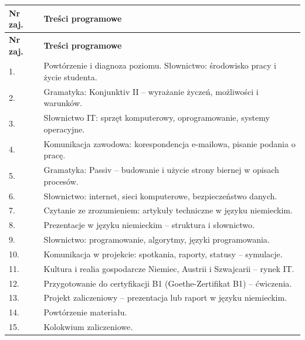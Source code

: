 \documentclass[12pt, a4paper]{article}
\newcommand{\thdrule}{\noalign{\global\setlength{\extrarowheight}{0pt}}}
\newcommand{\thdend}{\noalign{\global\setlength{\extrarowheight}{3pt}}}
\begin{document}
{\scriptsize
\begin{longtable}{m{1.5cm}m{14.5cm}}
\thdrule\toprule
\rowcolor{pjatkRed} {\color{white}\textbf{Nr zaj.}} & {\color{white}\textbf{Treści programowe}} \\
\midrule\thdend
\endfirsthead
\thdrule\toprule
\rowcolor{pjatkRed} {\color{white}\textbf{Nr zaj.}} & {\color{white}\textbf{Treści programowe}} \\
\midrule\thdend
\endhead
  \rowcolor{tableRowLight} 1. & Powtórzenie i diagnoza poziomu. Słownictwo: środowisko pracy i życie studenta. \\
  \rowcolor{tableRowAlt} 2. & Gramatyka: Konjunktiv II – wyrażanie życzeń, możliwości i warunków. \\
  \rowcolor{tableRowLight} 3. & Słownictwo IT: sprzęt komputerowy, oprogramowanie, systemy operacyjne. \\
  \rowcolor{tableRowAlt} 4. & Komunikacja zawodowa: korespondencja e-mailowa, pisanie podania o pracę. \\
  \rowcolor{tableRowLight} 5. & Gramatyka: Passiv – budowanie i użycie strony biernej w opisach procesów. \\
  \rowcolor{tableRowAlt} 6. & Słownictwo: internet, sieci komputerowe, bezpieczeństwo danych. \\
  \rowcolor{tableRowLight} 7. & Czytanie ze zrozumieniem: artykuły techniczne w języku niemieckim. \\
  \rowcolor{tableRowAlt} 8. & Prezentacje w języku niemieckim – struktura i słownictwo. \\
  \rowcolor{tableRowLight} 9. & Słownictwo: programowanie, algorytmy, języki programowania. \\
  \rowcolor{tableRowAlt} 10. & Komunikacja w projekcie: spotkania, raporty, statusy – symulacje. \\
  \rowcolor{tableRowLight} 11. & Kultura i realia gospodarcze Niemiec, Austrii i Szwajcarii – rynek IT. \\
  \rowcolor{tableRowAlt} 12. & Przygotowanie do certyfikacji B1 (Goethe-Zertifikat B1) – ćwiczenia. \\
  \rowcolor{tableRowLight} 13. & Projekt zaliczeniowy – prezentacja lub raport w języku niemieckim. \\
  \rowcolor{tableRowAlt} 14. & Powtórzenie materiału. \\
  \rowcolor{tableRowLight} 15. & Kolokwium zaliczeniowe. \\
\bottomrule
\end{longtable}}
\end{document}
